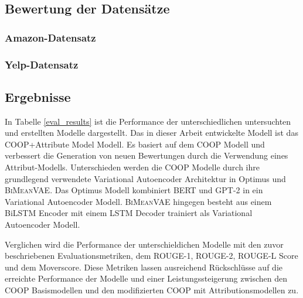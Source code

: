 \subsection{Bewertung der Datensätze}

\subsubsection{Amazon-Datensatz}

\subsubsection{Yelp-Datensatz}

\subsection{Ergebnisse}
In Tabelle \ref{eval_results} ist die Performance der unterschiedlichen untersuchten und erstellten Modelle dargestellt.
Das in dieser Arbeit entwickelte Modell ist das \glqq COOP+Attribute Model\grqq{} Modell.
Es basiert auf dem COOP Modell und verbessert die Generation von neuen Bewertungen durch die Verwendung eines Attribut-Modells.
Unterschieden werden die COOP Modelle durch ihre grundlegend verwendete Variational Autoencoder Architektur in Optimus und \textsc{BiMeanVAE}.
Das Optimus Modell kombiniert BERT und GPT-2 in ein Variational Autoencoder Modell. \textsc{BiMeanVAE} hingegen besteht aus einem BiLSTM Encoder mit einem LSTM Decoder trainiert als Variational Autoencoder Modell.

Verglichen wird die Performance der unterschieldichen Modelle mit den zuvor beschriebenen Evaluationsmetriken, dem ROUGE-1, ROUGE-2, ROUGE-L Score und dem Moverscore.
Diese Metriken lassen ausreichend Rückschlüsse auf die erreichte Performance der Modelle und einer Leistungssteigerung zwischen den COOP Basismodellen und den modifizierten COOP mit Attributionsmodellen zu.

